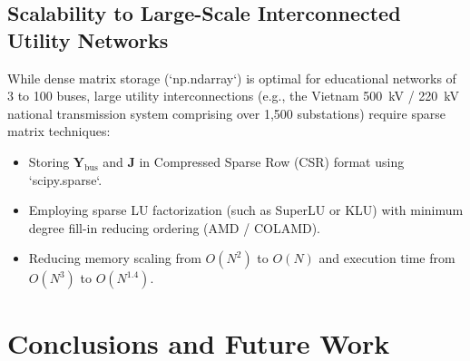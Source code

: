 \documentclass[12pt,a4paper,oneside]{report}
\begin{document}
\section{Scalability to Large-Scale Interconnected Utility Networks}
While dense matrix storage (`np.ndarray`) is optimal for educational networks of 3 to 100 buses, large utility interconnections (e.g., the Vietnam 500~kV / 220~kV national transmission system comprising over 1,500 substations) require sparse matrix techniques:
\begin{itemize}
    \item Storing $\mathbf{Y}_{\text{bus}}$ and $\mathbf{J}$ in Compressed Sparse Row (CSR) format using `scipy.sparse`.
    \item Employing sparse LU factorization (such as SuperLU or KLU) with minimum degree fill-in reducing ordering (AMD / COLAMD).
    \item Reducing memory scaling from $O(N^2)$ to $O(N)$ and execution time from $O(N^3)$ to $O(N^{1.4})$.
\end{itemize}

\chapter{Conclusions and Future Work}
\end{document}

